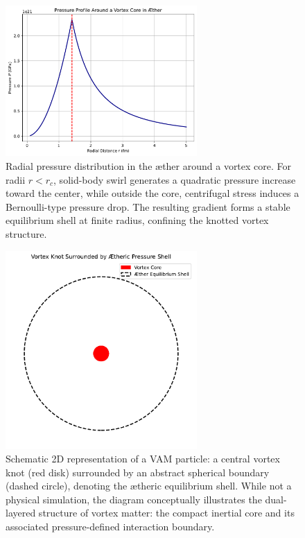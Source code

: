 \begin{figure}[h!]
    \centering
    \includegraphics[width=0.65\textwidth]{PressureProfileAroundCore}
    \caption{Radial pressure distribution in the æther around a vortex core.
    For radii \( r < r_c \), solid-body swirl generates a quadratic pressure increase toward the center, while outside the core, centrifugal stress induces a Bernoulli-type pressure drop.
    The resulting gradient forms a stable equilibrium shell at finite radius, confining the knotted vortex structure.}
\end{figure}

\begin{figure}[h!]
    \centering
    \includegraphics[width=0.65\textwidth]{PressureProfileAroundCore2}
    \caption{Schematic 2D representation of a VAM particle: a central vortex knot (red disk) surrounded by an abstract spherical boundary (dashed circle), denoting the ætheric equilibrium shell. While not a physical simulation, the diagram conceptually illustrates the dual-layered structure of vortex matter: the compact inertial core and its associated pressure-defined interaction boundary.}
\end{figure}

